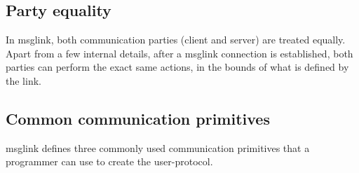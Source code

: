 \documentclass[conference]{IEEEtran}
\begin{document}
\subsection{Party equality}

In msglink, both communication parties (client and server) are treated equally. Apart from a few internal details, after a msglink connection is established, both parties can perform the exact same actions, in the bounds of what is defined by the link.


\subsection{Common communication primitives}

msglink defines three commonly used communication primitives that a programmer can use to create the user-protocol.
\end{document}
